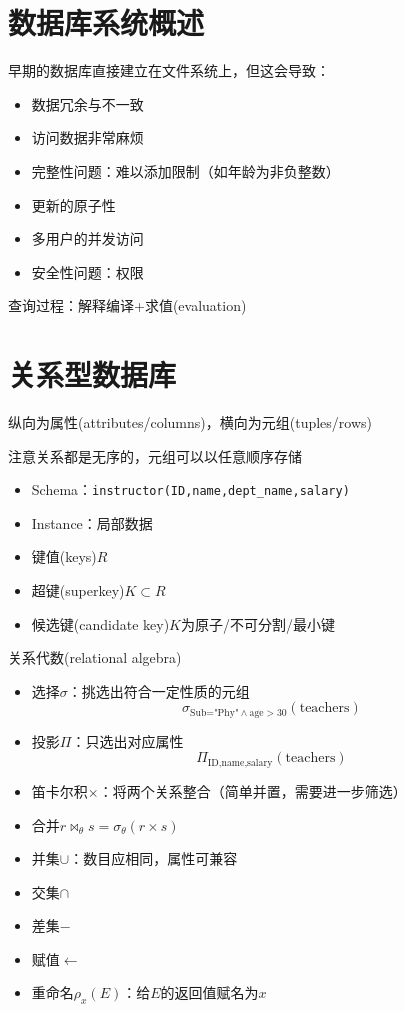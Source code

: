 
\section{数据库系统概述}
早期的数据库直接建立在文件系统上，但这会导致：
\begin{itemize}
	\item 数据冗余与不一致
	\item 访问数据非常麻烦
	\item 完整性问题：难以添加限制（如年龄为非负整数）
	\item 更新的原子性
	\item 多用户的并发访问
	\item 安全性问题：权限
\end{itemize}

查询过程：解释编译+求值(evaluation)

\section{关系型数据库}
纵向为属性(attributes/columns)，横向为元组(tuples/rows)

注意关系都是无序的，元组可以以任意顺序存储

\begin{itemize}
	\item Schema：\verb'instructor(ID,name,dept_name,salary)'
	\item Instance：局部数据
	\item 键值(keys)$R$
	\item 超键(superkey)$K\subset R$
	\item 候选键(candidate key)$K$为原子/不可分割/最小键
\end{itemize}

关系代数(relational algebra)
\begin{itemize}
	\item 选择$\sigma$：挑选出符合一定性质的元组
	\[\sigma_{\text{Sub="Phy"}\land\text{age}>30}(\text{teachers})\]
	\item 投影$\Pi$：只选出对应属性
	\[\Pi_{\text{ID,name,salary}}(\text{teachers})\]
	\item 笛卡尔积$\times$：将两个关系整合（简单并置，需要进一步筛选）
	\item 合并$r\Join_\theta s=\sigma_\theta(r\times s)$
	\item 并集$\cup$：数目应相同，属性可兼容
	\item 交集$\cap$
	\item 差集$-$
	\item 赋值$\gets$
	\item 重命名$\rho_x(E)$：给$E$的返回值赋名为$x$
\end{itemize}